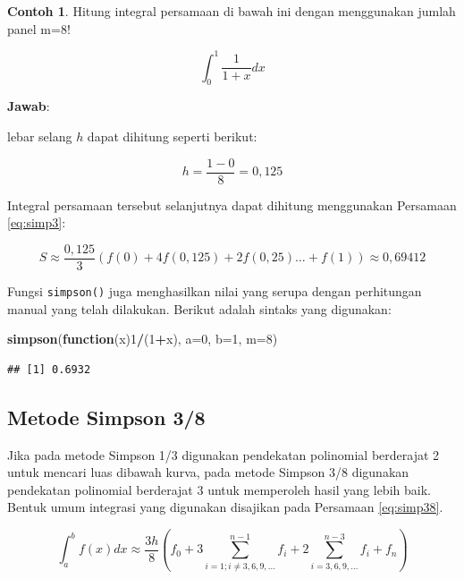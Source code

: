 \documentclass[
]{book}
\newenvironment{Shaded}{\begin{snugshade}}{\end{snugshade}}
\newcommand{\AttributeTok}[1]{\textcolor[rgb]{0.13,0.29,0.53}{#1}}
\newcommand{\ControlFlowTok}[1]{\textcolor[rgb]{0.13,0.29,0.53}{\textbf{#1}}}
\newcommand{\DecValTok}[1]{\textcolor[rgb]{0.00,0.00,0.81}{#1}}
\newcommand{\FunctionTok}[1]{\textcolor[rgb]{0.13,0.29,0.53}{\textbf{#1}}}
\newcommand{\NormalTok}[1]{#1}
\newcommand{\SpecialCharTok}[1]{\textcolor[rgb]{0.81,0.36,0.00}{\textbf{#1}}}
\theoremstyle{definition}
\theoremstyle{definition}
\newtheorem{example}{Contoh}[chapter]
\theoremstyle{definition}
\theoremstyle{definition}
\theoremstyle{remark}
\begin{document}
\begin{example}
\protect\hypertarget{exm:simpexm}{}\label{exm:simpexm}Hitung integral persamaan di bawah ini dengan menggunakan jumlah panel m=8!
\end{example}

\[
\int_{0}^1 \frac{1}{1+x}dx
\]

\textbf{Jawab}:

lebar selang \(h\) dapat dihitung seperti berikut:

\[
h = \frac{1-0}{8}=0,125
\]

Integral persamaan tersebut selanjutnya dapat dihitung menggunakan Persamaan \eqref{eq:simp3}:

\[
S\approx\frac{0,125}{3}\left(f\left(0\right)+4f\left(0,125\right)+2f\left(0,25\right)\dots+f\left(1\right)\right)\approx 0,69412
\]

Fungsi \texttt{simpson()} juga menghasilkan nilai yang serupa dengan perhitungan manual yang telah dilakukan. Berikut adalah sintaks yang digunakan:

\begin{Shaded}
\begin{Highlighting}[]
\FunctionTok{simpson}\NormalTok{(}\ControlFlowTok{function}\NormalTok{(x)}\DecValTok{1}\SpecialCharTok{/}\NormalTok{(}\DecValTok{1}\SpecialCharTok{+}\NormalTok{x), }\AttributeTok{a=}\DecValTok{0}\NormalTok{, }\AttributeTok{b=}\DecValTok{1}\NormalTok{, }\AttributeTok{m=}\DecValTok{8}\NormalTok{)}
\end{Highlighting}
\end{Shaded}

\begin{verbatim}
## [1] 0.6932
\end{verbatim}

\hypertarget{simpson38}{%
\subsection{Metode Simpson 3/8}\label{simpson38}}

Jika pada metode Simpson 1/3 digunakan pendekatan polinomial berderajat 2 untuk mencari luas dibawah kurva, pada metode Simpson 3/8 digunakan pendekatan polinomial berderajat 3 untuk memperoleh hasil yang lebih baik. Bentuk umum integrasi yang digunakan disajikan pada Persamaan \eqref{eq:simp38}.

\begin{equation}
\int_a^bf\left(x\right)dx\approx\frac{3h}{8}\left(f_0+3\sum_{i=1;i\ne3,6,9,\dots}^{n-1}f_i+2\sum_{i=3,6,9,\dots}^{n-3}f_i+f_n\right)
  \label{eq:simp38}
\end{equation}
\end{document}
